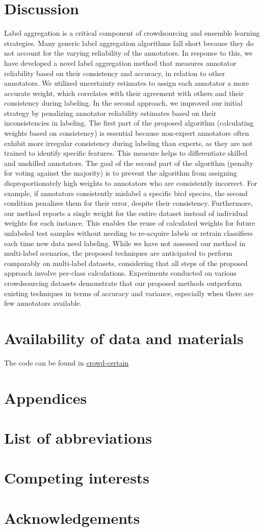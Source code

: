 \section{Discussion}
Label aggregation is a critical component of crowdsourcing and ensemble learning strategies. Many generic label aggregation algorithms fall short because they do not account for the varying reliability of the annotators. In response to this, we have developed a novel label aggregation method that measures annotator reliability based on their consistency and accuracy, in relation to other annotators. We utilized uncertainty estimates to assign each annotator a more accurate weight, which correlates with their agreement with others and their consistency during labeling. In the second approach, we improved our initial strategy by penalizing annotator reliability estimates based on their inconsistencies in labeling.
The first part of the proposed algorithm (calculating weights based on consistency) is essential because non-expert annotators often exhibit more irregular consistency during labeling than experts, as they are not trained to identify specific features. This measure helps to differentiate skilled and unskilled annotators. The goal of the second part of the algorithm (penalty for voting against the majority) is to prevent the algorithm from assigning disproportionately high weights to annotators who are consistently incorrect. For example, if annotators consistently mislabel a specific bird species, the second condition penalizes them for their error, despite their consistency.
Furthermore, our method reports a single weight for the entire dataset instead of individual weights for each instance. This enables the reuse of calculated weights for future unlabeled test samples without needing to re-acquire labels or retrain classifiers each time new data need labeling. While we have not assessed our method in multi-label scenarios, the proposed techniques are anticipated to perform comparably on multi-label datasets, considering that all steps of the proposed approach involve per-class calculations. Experiments conducted on various crowdsourcing datasets demonstrate that our proposed methods outperform existing techniques in terms of accuracy and variance, especially when there are few annotators available.




\section{Availability of data and materials}
The code can be found in \href{https://github.com/artinmajdi/crowdcertain}{crowd-certain}

\section{Appendices}
\section*{List of abbreviations}
\section*{Competing interests}
\section*{Acknowledgements}


